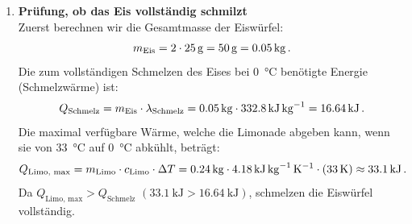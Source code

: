 \documentclass[ngerman]{scrreprt}
\newenvironment{loesungbox}[1]
  {\needspace{5\baselineskip}\begin{loesungboxstyle}[frametitle={#1}]}
  {\end{loesungboxstyle}}
\begin{document}
\begin{loesungbox}{Lösung zu \Cref{aufg:eiswuerfel_limo}}
\begin{enumerate}
    \item \textbf{Prüfung, ob das Eis vollständig schmilzt} \\
    Zuerst berechnen wir die Gesamtmasse der Eiswürfel:
    \begin{equation}
        m_{\text{Eis}} = 2 \cdot \SI{25}{\gram} = \SI{50}{\gram} = \SI{0.05}{\kilogram} \,.
    \end{equation}
    Die zum vollständigen Schmelzen des Eises bei \SI{0}{\degreeCelsius} benötigte Energie \\ (Schmelzwärme) ist:
    \begin{equation}\label{eq: Q_schmelz_limo}
        Q_{\text{Schmelz}} = m_{\text{Eis}} \cdot \lambda_{\text{Schmelz}} = \SI{0.05}{\kg} \cdot \SI{332.8}{\kilo\joule\per\kilogram} = \SI{16.64}{\kilo\joule} \mDot
    \end{equation}
    Die maximal verfügbare Wärme, welche die Limonade abgeben kann, wenn sie von \SI{33}{\degreeCelsius} auf \SI{0}{\degreeCelsius} abkühlt, beträgt:
    \begin{equation}\label{eq: Q_limo_max}
        Q_{\text{Limo, max}} = m_{\text{Limo}} \cdot c_{\text{Limo}} \cdot \Delta T = \SI{0.24}{\kg} \cdot \SI{4.18}{\kilo\joule\per\kilogram\per\kelvin} \cdot (\SI{33}{\kelvin}) \approx \SI{33.1}{\kilo\joule} \mDot
    \end{equation}
    Da $Q_{\text{Limo, max}} > Q_{\text{Schmelz}}$ $(\SI{33.1}{\kilo\joule} > \SI{16.64}{\kilo\joule})$, schmelzen die Eiswürfel vollständig.


\end{enumerate}
\end{loesungbox}
\end{document}
